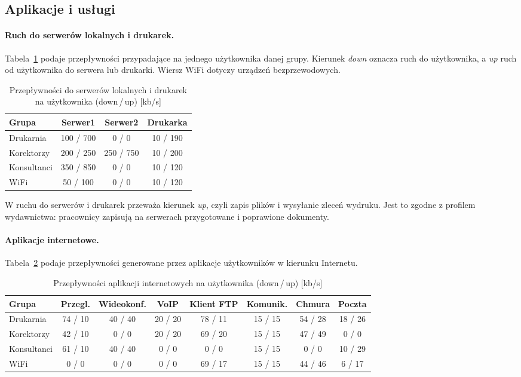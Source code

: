 \documentclass[12pt,a4paper]{article}
\begin{document}
\subsection{Aplikacje i usługi}

\paragraph{Ruch do serwerów lokalnych i drukarek.} Tabela~\ref{tab:lokalne}
podaje przepływności przypadające na jednego użytkownika danej grupy.
Kierunek \emph{down} oznacza ruch do użytkownika, a \emph{up} ruch od
użytkownika do serwera lub drukarki. Wiersz WiFi dotyczy urządzeń
bezprzewodowych.

\begin{table}[htbp]
\centering
\caption{Przepływności do serwerów lokalnych i drukarek na użytkownika (down\,/\,up) [kb/s]}
\label{tab:lokalne}
\begin{tabular}{lccc}
\toprule
Grupa & Serwer1 & Serwer2 & Drukarka \\
\midrule
Drukarnia   & 100 / 700 &   0 / 0   & 10 / 190 \\
Korektorzy  & 200 / 250 & 250 / 750 & 10 / 200 \\
Konsultanci & 350 / 850 &   0 / 0   & 10 / 120 \\
WiFi        &  50 / 100 &   0 / 0   & 10 / 120 \\
\bottomrule
\end{tabular}
\end{table}

W ruchu do serwerów i drukarek przeważa kierunek \emph{up}, czyli zapis plików
i wysyłanie zleceń wydruku. Jest to zgodne z profilem wydawnictwa: pracownicy
zapisują na serwerach przygotowane i poprawione dokumenty.

\paragraph{Aplikacje internetowe.} Tabela~\ref{tab:aplikacje} podaje
przepływności generowane przez aplikacje użytkowników w kierunku Internetu.

\begin{table}[htbp]
\centering
\caption{Przepływności aplikacji internetowych na użytkownika (down\,/\,up) [kb/s]}
\label{tab:aplikacje}
\small
\setlength{\tabcolsep}{4pt}
\begin{tabular}{lccccccc}
\toprule
Grupa & Przegl. & Wideokonf. & VoIP & Klient FTP & Komunik. & Chmura & Poczta \\
\midrule
Drukarnia   & 74 / 10 & 40 / 40 & 20 / 20 & 78 / 11 & 15 / 15 & 54 / 28 & 18 / 26 \\
Korektorzy  & 42 / 10 &  0 / 0  & 20 / 20 & 69 / 20 & 15 / 15 & 47 / 49 &  0 / 0  \\
Konsultanci & 61 / 10 & 40 / 40 &  0 / 0  &  0 / 0  & 15 / 15 &  0 / 0  & 10 / 29 \\
WiFi        &  0 / 0  &  0 / 0  &  0 / 0  & 69 / 17 & 15 / 15 & 44 / 46 &  6 / 17 \\
\bottomrule
\end{tabular}
\end{table}
\end{document}

